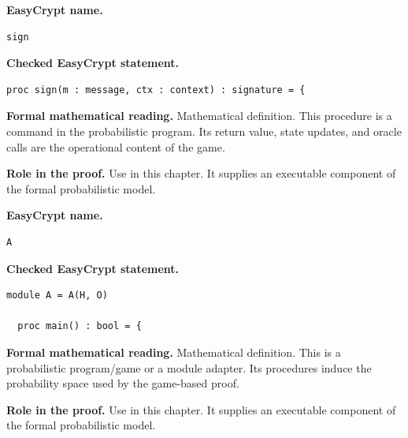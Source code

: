\begin{formaldefinition}
\noindent\textbf{EasyCrypt name.}
\begin{lstlisting}[language=EasyCrypt,basicstyle=\ttfamily\scriptsize]
sign
\end{lstlisting}
\noindent\textbf{Checked EasyCrypt statement.}
\begin{lstlisting}[language=EasyCrypt,basicstyle=\ttfamily\scriptsize]
proc sign(m : message, ctx : context) : signature = {
\end{lstlisting}
\noindent\textbf{Formal mathematical reading.}
Mathematical definition. This procedure is a command in the probabilistic program.  Its return value, state updates, and oracle calls are the operational content of the game.

\noindent\textbf{Role in the proof.}
Use in this chapter. It supplies an executable component of the formal probabilistic model.

\end{formaldefinition}

\begin{formaldefinition}
\noindent\textbf{EasyCrypt name.}
\begin{lstlisting}[language=EasyCrypt,basicstyle=\ttfamily\scriptsize]
A
\end{lstlisting}
\noindent\textbf{Checked EasyCrypt statement.}
\begin{lstlisting}[language=EasyCrypt,basicstyle=\ttfamily\scriptsize]
module A = A(H, O)

  proc main() : bool = {
\end{lstlisting}
\noindent\textbf{Formal mathematical reading.}
Mathematical definition. This is a probabilistic program/game or a module adapter.  Its procedures induce the probability space used by the game-based proof.

\noindent\textbf{Role in the proof.}
Use in this chapter. It supplies an executable component of the formal probabilistic model.

\end{formaldefinition}


